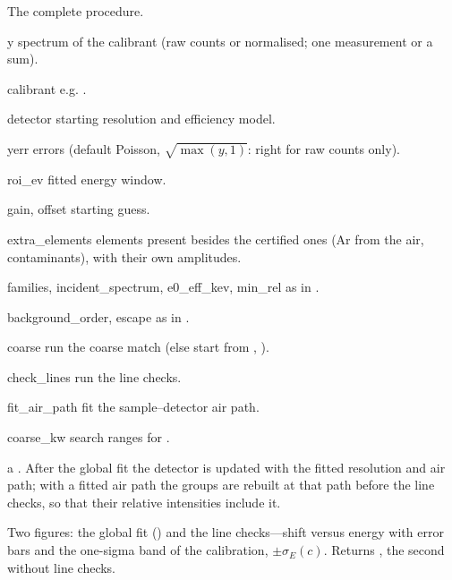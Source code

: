 The complete procedure.
\begin{args}
\item[y] spectrum of the calibrant (raw counts or normalised; one measurement or a sum).
\item[calibrant] e.g. .
\item[detector] starting resolution and efficiency model.
\item[yerr] errors (default Poisson, $\sqrt{\max(y,1)}$: right for raw counts only).
\item[roi\_ev] fitted energy window.
\item[gain, offset] starting guess.
\item[extra\_elements] elements present besides the certified ones (Ar from the air,
  contaminants), with their own amplitudes.
\item[families, incident\_spectrum, e0\_eff\_kev, min\_rel] as in .
\item[background\_order, escape] as in .
\item[coarse] run the coarse match (else start from , ).
\item[check\_lines] run the line checks.
\item[fit\_air\_path] fit the sample--detector air path.
\item[coarse\_kw] search ranges for .
\end{args}
 a . After the global fit the detector is updated with the
fitted resolution and air path; with a fitted air path the groups are rebuilt at that path
before the line checks, so that their relative intensities include it.

Two figures: the global fit () and the line checks---shift versus energy with
error bars and the one-sigma band of the calibration, $\pm\sigma_E(c)$. Returns
, the second  without line checks.
